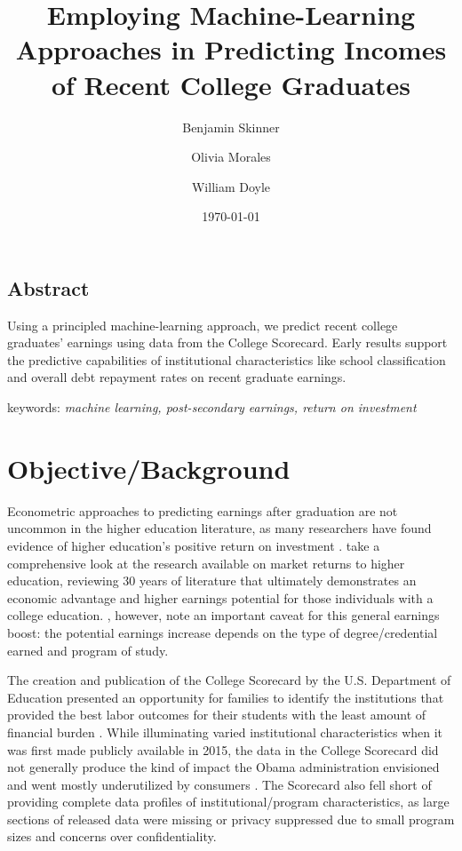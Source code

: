 \documentclass[a4paper, 12pt]{article}
\title{Employing Machine-Learning Approaches in Predicting Incomes of Recent College Graduates}
\author[1]{Benjamin Skinner}
\author[2]{Olivia Morales}
\author[3]{William Doyle}
\affil[1, 2]{University of Florida}
\affil[3]{Vanderbilt University}
\date{\today}
\begin{document}
\maketitle

\doublespacing

\begin{center}
\section*{Abstract}
\end{center}

Using a principled machine-learning approach, we predict recent
college graduates' earnings using data from the College
Scorecard. Early results support the predictive capabilities of
institutional characteristics like school classification and overall
debt repayment rates on recent graduate earnings.

\vspace{5mm}

keywords: \emph{machine learning, post-secondary earnings, return on investment}

\pagebreak
\section*{Objective/Background}

Econometric approaches to predicting earnings after graduation are not uncommon in the higher education literature, as many researchers have found evidence of higher education's positive return on investment \parencite{doyle2016educearn, card:1995, Card:1999, Card:2001, Oreopoulous_Petronijevic_2013}. \textcite{Oreopoulous_Petronijevic_2013} take a comprehensive look at the research available on market returns to higher education, reviewing 30 years of literature that ultimately demonstrates an economic advantage and higher earnings potential for those individuals with a college education. \textcite{Carnevale_etal_2011}, however, note an important caveat for this general earnings boost: the potential earnings increase depends on the type of degree/credential earned and program of study.

The creation and publication of the College Scorecard by the U.S. Department of Education presented an opportunity for families to identify the institutions that provided the best labor outcomes for their students with the least amount of financial burden \parencite{obama_2013}. While illuminating varied institutional characteristics when it was first made publicly available in 2015, the data in the College Scorecard did not generally produce the kind of impact the Obama administration envisioned and went mostly underutilized by consumers \parencite{huntington2016search}. The Scorecard also fell short of providing complete data profiles of institutional/program characteristics, as large sections of released data were missing or privacy suppressed due to small program sizes and concerns over confidentiality.
\end{document}
